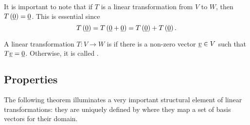 It is important to note that if $T$ is a linear transformation from $V$ to $W$, then $T \left( \underline{0} \right) = \underline{0}$.
This is essential since
\begin{equation*}
T \left( \underline{0} \right)
= T \left( \underline{0} + \underline{0} \right)
= T \left( \underline{0} \right) + T \left( \underline{0} \right) .
\end{equation*}

\begin{definition}
A linear transformation $T \colon V \rightarrow W$ is  if there is a non-zero vector $\underline{v} \in V$ such that $T \underline{v} = \underline{0}$.
Otherwise, it is called .
\end{definition}

\subsection{Properties}

The following theorem illuminates a very important structural element of linear transformations: they are uniquely defined by where they map a set of basis vectors for their domain.

